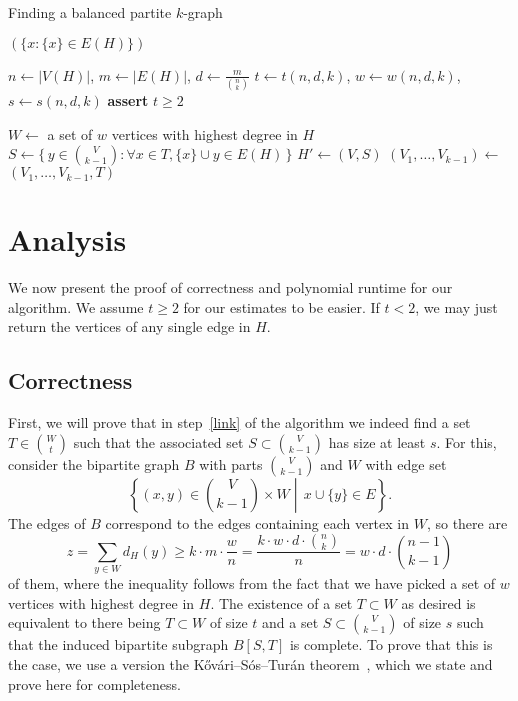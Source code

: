 \documentclass[12pt]{article}
\begin{document}
\begin{algorithm}[H]
    \caption{Finding a balanced partite $k$-graph}
    \label{alg:kpartite}
    \begin{algorithmic}[1]
                \State \Return $(\{x \colon \{x\} \in E(H)\})$
            \EndIf

            \State $n \gets |V(H)|$, $m \gets |E(H)|$, $d \gets \frac{m}{\binom{n}{k}}$
            \State $t \gets t(n, d, k)$, $w \gets w(n, d, k)$, $s \gets s(n, d, k)$
            \State \textbf{assert} $t \ge 2$

            \State $W \gets$ a set of $w$ vertices with highest degree in $H$
                \State $S \gets \{\,y \in \binom{V}{k-1} \colon \forall x \in T, \{x\} \cup y \in E(H)\,\}$
                    \State $H' \gets (V, S)$  
                    \State $(V_1, \dots, V_{k-1}) \gets$ 
                    \State \Return $(V_1, \dots, V_{k-1}, T)$
                \EndIf
            \EndFor
        \EndFunction
    \end{algorithmic}
\end{algorithm}

\section{Analysis}\label{sec:analysis}

We now present the proof of correctness and polynomial runtime for our algorithm.
We assume $t \ge 2$ for our estimates to be easier.
If $t < 2$, we may just return the vertices of any single edge in $H$.

\subsection{Correctness}\label{subsec:correctness}

First, we will prove that in step~\ref{link} of the algorithm
we indeed find a set $T \in \binom{W}{t}$ such that the associated set $S \subset \binom{V}{k-1}$ has size at least $s$.
For this, consider the bipartite graph $B$ with parts $\binom{V}{k-1}$ and $W$ with edge set
\[
  \left\{(x, y) \in \binom{V}{k-1} \times W \middle| \, x \cup \{y\} \in E \right\}.
\]
The edges of $B$ correspond to the edges containing each vertex in $W$, so there are
\[
    z = \sum_{y \in W} d_H(y) \geq k \cdot m \cdot \frac{w}{n} = \frac{k \cdot w \cdot d \cdot \binom{n}{k}}{n} = w \cdot d \cdot \binom{n - 1}{k-1}
\]
of them, where the inequality follows from the fact that we have picked a set of $w$ vertices with highest degree in $H$.
The existence of a set $T \subset W$ as desired is equivalent to there being $T \subset W$ of size $t$ and a set $S \subset \binom{V}{k-1}$ of size $s$
such that the induced bipartite subgraph $B[S, T]$ is complete.
To prove that this is the case,
we use a version the Kővári–Sós–Turán theorem~\cite{Kovari1954},
which we state and prove here for completeness.
\end{document}
